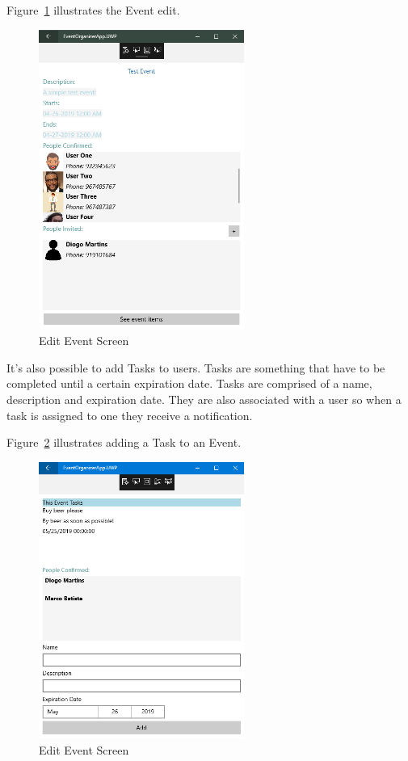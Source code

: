 \newpage

Figure~\ref{fig:EditEventScreenShot} illustrates the Event edit.

\begin{figure}[!ht]
	\centering
	\includegraphics[width=0.60\textwidth,height=0.50\textheight]{./Chapter3/Figures/ClientAppScreenShots/Event13}
	\caption{Edit Event Screen}
	\label{fig:EditEventScreenShot}
\end{figure}

\newpage

It's also possible to add Tasks to users. Tasks are something that have to be completed until a certain expiration date. Tasks are comprised of a name, description and expiration date. They are also associated with a user so when a task is assigned to one they receive a notification.

Figure~\ref{fig:AddTaskToEvent} illustrates adding a Task to an Event.

\begin{figure}[!ht]
	\centering
	\includegraphics[width=0.60\textwidth,height=0.50\textheight]{./Chapter3/Figures/ClientAppScreenShots/AddTask_01}
	\caption{Edit Event Screen}
	\label{fig:AddTaskToEvent}
\end{figure}

